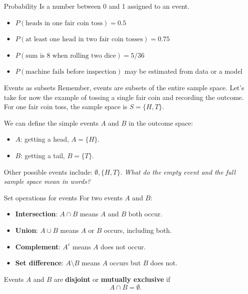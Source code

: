 \documentclass[12pt]{beamer}
\newcommand{\vocab}[1]{\textcolor{AggieMaroon}{\textbf{#1}}}
\begin{document}
\begin{frame}{}
\begin{block}{Probability}
Is a number between 0 and 1 assigned to an event.

\vspace{0.4cm}
\begin{itemize}
  \item $P(\text{heads in one fair coin toss}) = 0.5$
  \item $P(\text{at least one head in two fair coin tosses}) = 0.75$
  \item $P(\text{sum is 8 when rolling two dice}) = 5/36$
  \item $P(\text{machine fails before inspection})$ may be estimated from data or a model
\end{itemize}
\end{block}
\end{frame}

\begin{frame}{}
\begin{block}{Events as subsets}
Remember, events are subsets of the entire sample space.
Let's take for now the example of tossing a single fair coin and recording the outcome.
For one fair coin toss, the sample space is $S = \{H,T\}$.

\vspace{0.2cm}
We can define the simple events $A$ and $B$ in the outcome space:
\begin{itemize}
  \item $A$: getting a head, $A = \{H\}$.
  \item $B$: getting a tail, $B = \{T\}$.
\end{itemize}

\vspace{0.2cm}
Other possible events include: $\emptyset, \{H,T\}$.
\emph{What do the empty event and the full sample space mean in words?}
\end{block}
\end{frame}

\begin{frame}{}
\begin{block}{Set operations for events}
For two events $A$ and $B$:

\begin{itemize}
  \item \vocab{Intersection}: $A \cap B$ means $A$ and $B$ both occur.
  \item \vocab{Union}: $A \cup B$ means $A$ or $B$ occurs, including both.
  \item \vocab{Complement}: $A^c$ means $A$ does not occur.
  \item \vocab{Set difference}: $A \setminus B$ means $A$ occurs but $B$ does not.
\end{itemize}

\vspace{0.3cm}
Events $A$ and $B$ are \vocab{disjoint} or \vocab{mutually exclusive} if
\[
A \cap B = \emptyset.
\]
\end{block}
\end{frame}
\end{document}
